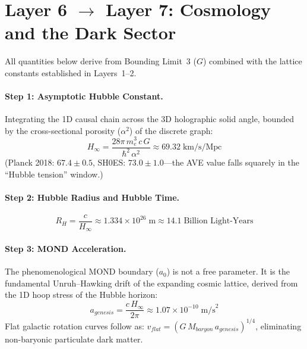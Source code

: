 \section{Layer 6 $\to$ Layer 7: Cosmology and the Dark Sector}
\label{sec:layer67}

All quantities below derive from Bounding Limit~3 ($G$) combined with the
lattice constants established in Layers~1--2.

\paragraph{Step 1: Asymptotic Hubble Constant.}
Integrating the 1D causal chain across the 3D holographic solid angle, bounded
by the cross-sectional porosity ($\alpha^2$) of the discrete graph:
\begin{equation}
    H_\infty
    = \frac{28\pi\,m_e^3\,c\,G}{\hbar^2\,\alpha^2}
    \approx 69.32\;\text{km/s/Mpc}
    \label{eq:H_inf}
\end{equation}
(Planck 2018: $67.4 \pm 0.5$, SH0ES: $73.0 \pm 1.0$---the AVE
value falls squarely in the ``Hubble tension'' window.)

\paragraph{Step 2: Hubble Radius and Hubble Time.}
\begin{equation}
    R_H = \frac{c}{H_\infty}
    \approx 1.334 \times 10^{26}\;\text{m}
    \approx 14.1\;\text{Billion Light-Years}
    \label{eq:RH}
\end{equation}

\paragraph{Step 3: MOND Acceleration.}
The phenomenological MOND boundary ($a_0$) is not a free parameter. It is the
fundamental Unruh--Hawking drift of the expanding cosmic lattice, derived from
the 1D hoop stress of the Hubble horizon:
\begin{equation}
    a_{genesis}
    = \frac{c\,H_\infty}{2\pi}
    \approx 1.07 \times 10^{-10}\;\text{m/s}^2
    \label{eq:a0}
\end{equation}
Flat galactic rotation curves follow as:
$v_{flat} = (G\,M_{baryon}\,a_{genesis})^{1/4}$, eliminating non-baryonic
particulate dark matter.

